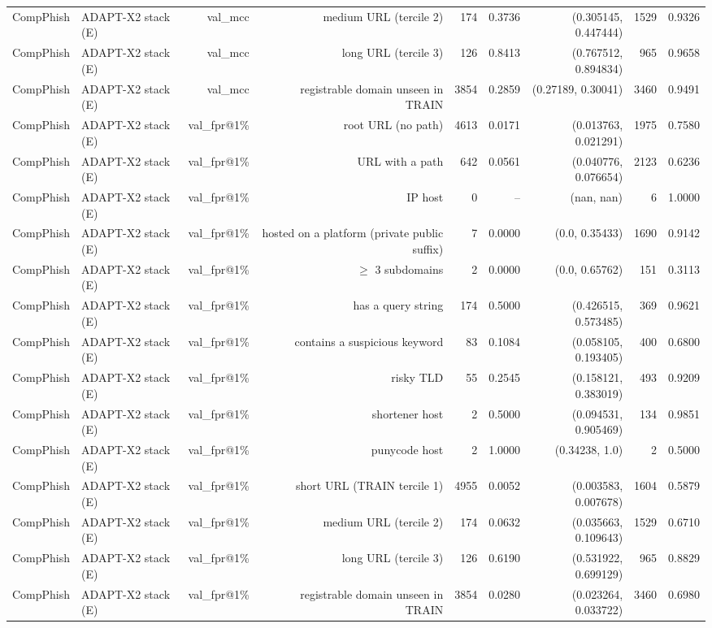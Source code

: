 \begin{table}[t]
\begin{tabular}{llrrrrrrr}
CompPhish & ADAPT-X2 stack (E) & val\_mcc & medium URL (tercile 2) & 174 & 0.3736 & (0.305145, 0.447444) & 1529 & 0.9326 \\
CompPhish & ADAPT-X2 stack (E) & val\_mcc & long URL (tercile 3) & 126 & 0.8413 & (0.767512, 0.894834) & 965 & 0.9658 \\
CompPhish & ADAPT-X2 stack (E) & val\_mcc & registrable domain unseen in TRAIN & 3854 & 0.2859 & (0.27189, 0.30041) & 3460 & 0.9491 \\
CompPhish & ADAPT-X2 stack (E) & val\_fpr@1\% & root URL (no path) & 4613 & 0.0171 & (0.013763, 0.021291) & 1975 & 0.7580 \\
CompPhish & ADAPT-X2 stack (E) & val\_fpr@1\% & URL with a path & 642 & 0.0561 & (0.040776, 0.076654) & 2123 & 0.6236 \\
CompPhish & ADAPT-X2 stack (E) & val\_fpr@1\% & IP host & 0 & -- & (nan, nan) & 6 & 1.0000 \\
CompPhish & ADAPT-X2 stack (E) & val\_fpr@1\% & hosted on a platform (private public suffix) & 7 & 0.0000 & (0.0, 0.35433) & 1690 & 0.9142 \\
CompPhish & ADAPT-X2 stack (E) & val\_fpr@1\% & $\geq$ 3 subdomains & 2 & 0.0000 & (0.0, 0.65762) & 151 & 0.3113 \\
CompPhish & ADAPT-X2 stack (E) & val\_fpr@1\% & has a query string & 174 & 0.5000 & (0.426515, 0.573485) & 369 & 0.9621 \\
CompPhish & ADAPT-X2 stack (E) & val\_fpr@1\% & contains a suspicious keyword & 83 & 0.1084 & (0.058105, 0.193405) & 400 & 0.6800 \\
CompPhish & ADAPT-X2 stack (E) & val\_fpr@1\% & risky TLD & 55 & 0.2545 & (0.158121, 0.383019) & 493 & 0.9209 \\
CompPhish & ADAPT-X2 stack (E) & val\_fpr@1\% & shortener host & 2 & 0.5000 & (0.094531, 0.905469) & 134 & 0.9851 \\
CompPhish & ADAPT-X2 stack (E) & val\_fpr@1\% & punycode host & 2 & 1.0000 & (0.34238, 1.0) & 2 & 0.5000 \\
CompPhish & ADAPT-X2 stack (E) & val\_fpr@1\% & short URL (TRAIN tercile 1) & 4955 & 0.0052 & (0.003583, 0.007678) & 1604 & 0.5879 \\
CompPhish & ADAPT-X2 stack (E) & val\_fpr@1\% & medium URL (tercile 2) & 174 & 0.0632 & (0.035663, 0.109643) & 1529 & 0.6710 \\
CompPhish & ADAPT-X2 stack (E) & val\_fpr@1\% & long URL (tercile 3) & 126 & 0.6190 & (0.531922, 0.699129) & 965 & 0.8829 \\
CompPhish & ADAPT-X2 stack (E) & val\_fpr@1\% & registrable domain unseen in TRAIN & 3854 & 0.0280 & (0.023264, 0.033722) & 3460 & 0.6980 \\

\end{tabular}
\end{table}
